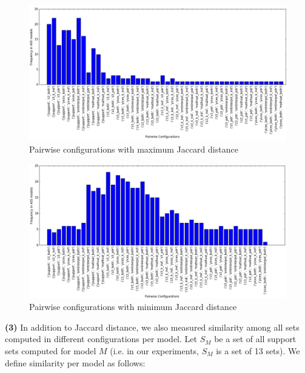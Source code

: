 \begin{figure}
  \centering
  \includegraphics[width=\textwidth]{figs/max_settings_analyses.png}
  \caption{\small{Pairwise configurations with maximum Jaccard distance}}\label{fig:maxdis}
\end{figure}


\begin{figure}
  \centering
  \includegraphics[width=\textwidth]{figs/min_settings_analyses.png}
  \caption{\small{Pairwise configurations with minimum Jaccard distance}}\label{fig:mindis}
\end{figure}

\vspace{6pt}
\noindent{}
 \vspace{9pt}

\textbf{(3)} In addition to Jaccard distance, we also measured similarity among all sets computed in different configurations per model. Let $S_M$ be a set of all support sets computed for model $M$ (i.e. in our experiments, $S_M$ is a set of 13 sets).  We define similarity per model as follows:

